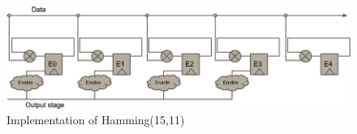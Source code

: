 
\begin{figure}
\includegraphics[width=15cm]{implementation/fig_ecc}
\caption{Implementation of Hamming(15,11)}
\label{fig:ecc}
\end{figure}

